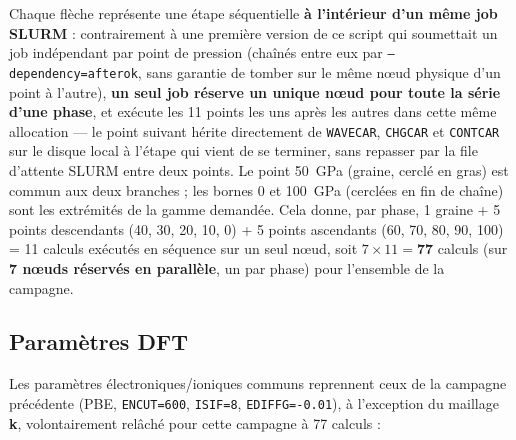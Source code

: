 \documentclass[11pt,a4paper]{article}
\begin{document}
\begin{center}
\end{center}

Chaque flèche représente une étape séquentielle \textbf{à l'intérieur d'un même job SLURM} :
contrairement à une première version de ce script qui soumettait un job indépendant par point
de pression (chaînés entre eux par \texttt{--dependency=afterok}, sans garantie de tomber sur
le même nœud physique d'un point à l'autre), \textbf{un seul job réserve un unique nœud pour
toute la série d'une phase}, et exécute les 11 points les uns après les autres dans cette même
allocation — le point suivant hérite directement de \texttt{WAVECAR}, \texttt{CHGCAR} et
\texttt{CONTCAR} sur le disque local à l'étape qui vient de se terminer, sans repasser par la
file d'attente SLURM entre deux points. Le point 50~GPa (graine, cerclé en gras) est commun aux
deux branches ; les bornes 0 et 100~GPa (cerclées en fin de chaîne) sont les extrémités de la
gamme demandée. Cela donne, par phase, 1 graine + 5 points descendants (40, 30, 20, 10, 0) + 5
points ascendants (60, 70, 80, 90, 100) = 11 calculs exécutés en séquence sur un seul nœud,
soit $7 \times 11 = \mathbf{77}$ calculs (sur \textbf{7 nœuds réservés en parallèle}, un par
phase) pour l'ensemble de la campagne.

\subsection{Paramètres DFT}

Les paramètres électroniques/ioniques communs reprennent ceux de la campagne précédente
(PBE, \texttt{ENCUT=600}, \texttt{ISIF=8}, \texttt{EDIFFG=-0.01}), à l'exception du maillage
\textbf{k}, volontairement relâché pour cette campagne à 77 calculs :
\end{document}
